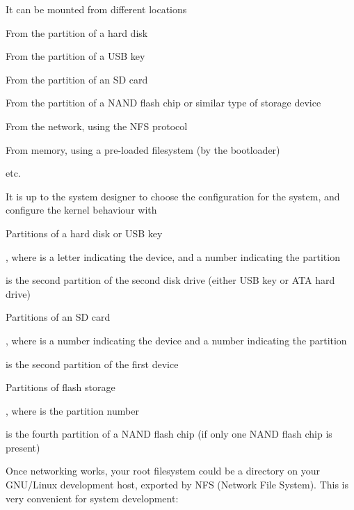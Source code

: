   \startitemize
  \item It can be mounted from different locations
    \startitemize
    \item From the partition of a hard disk
    \item From the partition of a USB key
    \item From the partition of an SD card
    \item From the partition of a NAND flash chip or similar type of
      storage device
    \item From the network, using the NFS protocol
    \item From memory, using a pre-loaded filesystem (by the
      bootloader)
    \item etc.
    \stopitemize
  \item It is up to the system designer to choose the configuration
    for the system, and configure the kernel behaviour with
  \stopitemize

  \startitemize
  \item Partitions of a hard disk or USB key
    \startitemize
    \item {}, where  is a letter indicating
      the device, and  a number indicating the partition
    \item {} is the second partition of the second disk
      drive (either USB key or ATA hard drive)
    \stopitemize
  \item Partitions of an SD card
    \startitemize
    \item {}, where  is a number
      indicating the device and  a number indicating the
      partition
    \item {} is the second partition of the first
      device
    \stopitemize
  \item Partitions of flash storage
    \startitemize
    \item {}, where  is the partition number
    \item {} is the fourth partition of a NAND
      flash chip (if only one NAND flash chip is present)
    \stopitemize
  \stopitemize


  Once networking works, your root filesystem could be a directory on
  your GNU/Linux development host, exported by NFS (Network File
  System). This is very convenient for system development:

